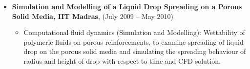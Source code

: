 \documentclass[a4paper,12pt]{article}
\begin{document}
\begin{itemize}
\item \textbf{Simulation and Modelling of a Liquid Drop Spreading on a Porous Solid Media, IIT Madras}, (July 2009 – May 2010)
\begin{itemize}
	\item Computational fluid dynamics (Simulation and Modelling): Wettability of polymeric fluids on porous reinforcements, to examine spreading of liquid drop on the porous solid media and simulating the spreading behaviour of radius and height of drop with respect to time and CFD solution.
\end{itemize}

\end{itemize}
\end{document}
